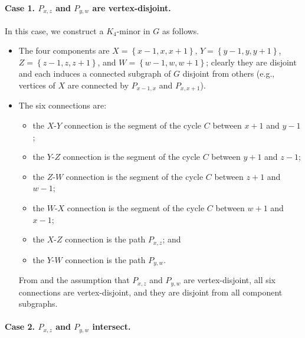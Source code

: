 \documentclass[11pt]{article}
\newcommand{\set}[1]{\left\{ #1 \right\}}
\begin{document}
\paragraph{Case 1. $P_{x,z}$ and $P_{y,w}$ are vertex-disjoint.}
In this case, we construct a $K_4$-minor in $G$ as follows. 
\begin{itemize}
    \item The four components are $X=\set{x-1,x,x+1}$, $Y=\set{y-1,y,y+1}$, $Z=\set{z-1,z,z+1}$, and $W=\set{w-1,w,w+1}$; clearly they are disjoint and each induces a connected subgraph of $G$ disjoint from others (e.g., vertices of $X$ are connected by $P_{x-1,x}$ and $P_{x,x+1}$). 
    \item The six connections are:
    \begin{itemize}
        \item the $X$-$Y$ connection is the segment of the cycle $C$ between $x+1$ and $y-1$;
        \item the $Y$-$Z$ connection is the segment of the cycle $C$ between $y+1$ and $z-1$;
        \item the $Z$-$W$ connection is the segment of the cycle $C$ between $z+1$ and $w-1$;
        \item the $W$-$X$ connection is the segment of the cycle $C$ between $w+1$ and $x-1$;
        \item the $X$-$Z$ connection is the path $P_{x,z}$; and
        \item the $Y$-$W$ connection is the path $P_{y,w}$.
    \end{itemize}
    From  and the assumption that $P_{x,z}$ and $P_{y,w}$ are vertex-disjoint, all six connections are vertex-disjoint, and they are disjoint from all component subgraphs.
\end{itemize}

\paragraph{Case 2. $P_{x,z}$ and $P_{y,w}$ intersect.}
\end{document}
